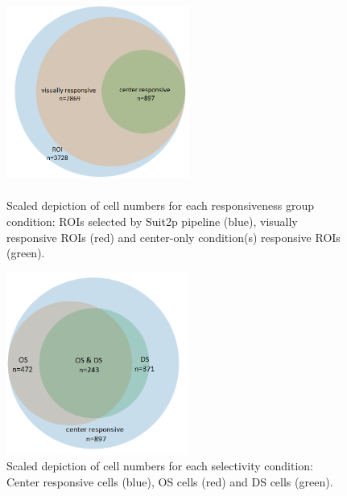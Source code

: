 \begin{figure}[h]
    \centering
    \begin{minipage}[t]{.4\textwidth}
        \centering
\includegraphics[width=6cm,height=6cm,keepaspectratio]{Figures/7.Results/data/ROIvisualCenter.png} 
\caption{Scaled depiction of cell numbers for each responsiveness group condition: ROIs selected by Suit2p pipeline (blue), visually responsive ROIs (red) and center-only condition(s) responsive ROIs (green).\label{groups1}}
\end{minipage}\hspace{1cm}
\begin{minipage}[t]{0.4\textwidth}
\centering
\includegraphics[width=6cm,height=6cm,keepaspectratio]{Figures/7.Results/data/centerOSDS.png} 
\caption{Scaled depiction of cell numbers for each selectivity condition: Center responsive cells (blue), OS cells (red) and DS cells (green).\label{groups2}}
\end{minipage}
\end{figure}

